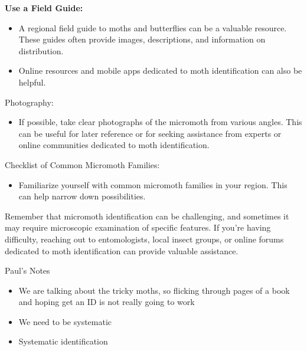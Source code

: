 \documentclass[
  ignorenonframetext,
]{beamer}
\providecommand{\tightlist}{%
  \setlength{\itemsep}{0pt}\setlength{\parskip}{0pt}}
\begin{document}
\begin{frame}{\textbf{Use a Field Guide:}}
\protect\hypertarget{use-a-field-guide}{}
\begin{itemize}
\tightlist
\item
  A regional field guide to moths and butterflies can be a valuable
  resource. These guides often provide images, descriptions, and
  information on distribution.
\item
  Online resources and mobile apps dedicated to moth identification can
  also be helpful.
\end{itemize}
\end{frame}

\begin{frame}{Photography:}
\protect\hypertarget{photography}{}
\begin{itemize}
\tightlist
\item
  If possible, take clear photographs of the micromoth from various
  angles. This can be useful for later reference or for seeking
  assistance from experts or online communities dedicated to moth
  identification.
\end{itemize}
\end{frame}

\begin{frame}{Checklist of Common Micromoth Families:}
\protect\hypertarget{checklist-of-common-micromoth-families}{}
\begin{itemize}
\tightlist
\item
  Familiarize yourself with common micromoth families in your region.
  This can help narrow down possibilities.
\end{itemize}

Remember that micromoth identification can be challenging, and sometimes
it may require microscopic examination of specific features. If you're
having difficulty, reaching out to entomologists, local insect groups,
or online forums dedicated to moth identification can provide valuable
assistance.
\end{frame}

\begin{frame}{Paul's Notes}
\protect\hypertarget{pauls-notes}{}
\begin{itemize}
\tightlist
\item
  We are talking about the tricky moths, so flicking through pages of a
  book and hoping get an ID is not really going to work
\item
  We need to be systematic
\item
  Systematic identification
\end{itemize}
\end{frame}
\end{document}
